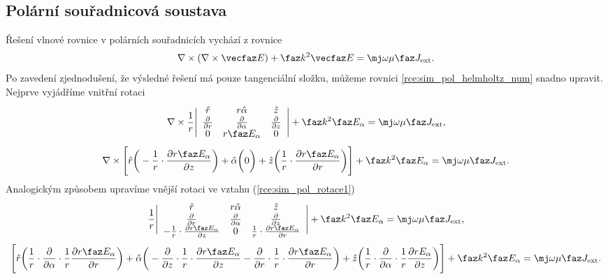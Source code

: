 \subsection{Polární souřadnicová soustava}
Řešení vlnové rovnice v polárních souřadnicích vychází z rovnice
\begin{equation}
	\nabla\times(\nabla\times\vecfaz E) +\faz k^{2}\vecfaz E = \mj\omega\mu\faz J_{\mathrm{ext}}.
	\label{rce:sim_pol_helmholtz_num} 
\end{equation}
Po zavedení zjednodušení, že výsledné řešení má pouze tangenciální složku, můžeme rovnici \ref{rce:sim_pol_helmholtz_num} snadno upravit. Nejprve vyjádříme vnitřní rotaci
\begin{displaymath}
	\nabla\times \frac{1}{r}\Bigg|
	\begin{array}{ccc}
\hat{r} & r\hat{\alpha} & \hat{z} \\
\frac{\partial}{\partial r} & \frac{\partial}{\partial \alpha} & \frac{\partial}{\partial z} \\
0 & r\faz E_{\alpha} & 0\\
\end{array}\Bigg| +\faz k^{2}\faz E_{\alpha} = \mj\omega\mu\faz J_{\mathrm{ext}},
\end{displaymath}
\begin{equation}
\nabla\times \Bigg[\hat{r}\bigg(-\frac{1}{r}\cdot\frac{\partial r\faz E_{\alpha}}{\partial z}\bigg) + \hat{\alpha}\bigg(0\bigg) + \hat{z}\bigg(\frac{1}{r}\cdot\frac{\partial r\faz E_{\alpha}}{\partial r}\bigg) \Bigg]+\faz k^{2}\faz E_{\alpha} = \mj\omega\mu\faz J_{\mathrm{ext}}.
	\label{rce:sim_pol_rotace1}
\end{equation}
Analogickým způsobem upravíme vnější rotaci ve vztahu (\ref{rce:sim_pol_rotace1})
\begin{displaymath}
	\frac{1}{r}\Bigg|
	\begin{array}{ccc}
\hat{r} & r\hat{\alpha} & \hat{z} \\
\frac{\partial}{\partial r} & \frac{\partial}{\partial \alpha} & \frac{\partial}{\partial z} \\
-\frac{1}{r}\cdot\frac{\partial r\faz E_{\alpha}}{\partial z} & 0 & \frac{1}{r}\cdot\frac{\partial r\faz E_{\alpha}}{\partial r}\\
\end{array}\Bigg| +\faz k^{2}\faz E_{\alpha} = \mj\omega\mu\faz J_{\mathrm{ext}},
\end{displaymath}
\begin{equation}
\Bigg[\hat{r}\bigg(\frac{1}{r}\cdot\frac{\partial}{\partial \alpha}\cdot\frac{1}{r}\frac{\partial r\faz E_{\alpha}}{\partial r}\bigg) + \hat{\alpha}\bigg(-\frac{\partial}{\partial z}\cdot\frac{1}{r}\cdot\frac{\partial r\faz E_{\alpha}}{\partial z} - \frac{\partial}{\partial r}\cdot\frac{1}{r}\cdot\frac{\partial r\faz E_{\alpha}}{\partial r}\bigg) + \hat{z}\bigg(\frac{1}{r}\cdot\frac{\partial}{\partial \alpha}\cdot\frac{1}{r}\frac{\partial r E_{\alpha}}{\partial z}\bigg) \Bigg]+\faz k^{2}\faz E_{\alpha} = \mj\omega\mu\faz J_{\mathrm{ext}}.
	\label{rce:sim_pol_rotace2}
\end{equation}

